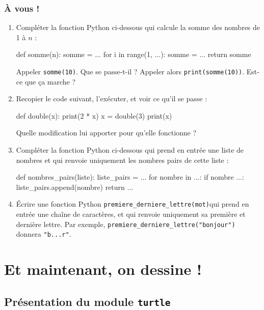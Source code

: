 \documentclass[12pt,a4paper, oneside]{article}
\theoremstyle{definition}
\begin{document}
   \subsubsection*{À vous !}
   \begin{enumerate}
      \item Compléter la fonction Python ci-dessous qui calcule la somme des nombres de 1 à $n$ :
         \begin{pyverbatim}
           def somme(n):
             somme = ...
             for i in range(1, ...):
               somme = ...
             return somme
         \end{pyverbatim}
      Appeler \texttt{somme(10)}.
      Que se passe-t-il ?
      Appeler alors \texttt{print(somme(10))}.
      Est-ce que ça marche ?
      \item Recopier le code suivant, l'exécuter, et voir ce qu'il se passe :
         \begin{pyverbatim}
            def double(x):
               print(2 * x)
            x = double(3)
            print(x)
         \end{pyverbatim}
      Quelle modification lui apporter pour qu'elle fonctionne ?
      \item Compléter la fonction Python ci-dessous qui prend en entrée une liste de nombres et qui renvoie uniquement les nombres pairs de cette liste :
         \begin{pyverbatim}
            def nombres_pairs(liste):
                liste_pairs = ...
                for nombre in ...:
                    if nombre ...:
                        liste_pairs.append(nombre)
                return ...
         \end{pyverbatim}
      \item Écrire une fonction Python \texttt{premiere\_derniere\_lettre(mot)}qui prend en entrée une chaîne de caractères, et qui renvoie uniquement sa première et dernière lettre.
      Par exemple, \texttt{premiere\_derniere\_lettre("bonjour")} donnera \texttt{"b...r"}.
   \end{enumerate}

\section{Et maintenant, on dessine !}\label{sec:et-maintenant-on-dessine-!}
   \subsection{Présentation du module \texttt{turtle}}\label{subsec:présentation-du-module-texttt-turtle}
   
\end{document}
